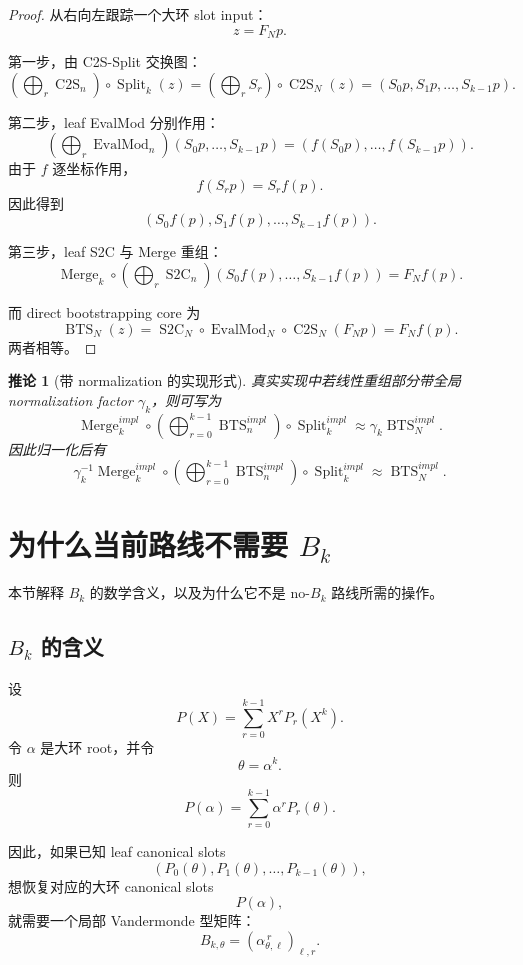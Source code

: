 \documentclass[UTF8,11pt]{ctexart}
\newtheorem{corollary}{推论}
\theoremstyle{definition}
\newcommand{\CtwoS}{\operatorname{C2S}}
\newcommand{\StwoC}{\operatorname{S2C}}
\newcommand{\BTS}{\operatorname{BTS}}
\newcommand{\Split}{\operatorname{Split}}
\newcommand{\Merge}{\operatorname{Merge}}
\newcommand{\EvalMod}{\operatorname{EvalMod}}
\begin{document}
\begin{proof}
从右向左跟踪一个大环 slot input：
\[
z=F_Np.
\]

第一步，由 C2S-Split 交换图：
\[
\left(\bigoplus_r \CtwoS_n\right)\circ\Split_k(z)
=
\left(\bigoplus_r S_r\right)\circ\CtwoS_N(z)
=
(S_0p,S_1p,\ldots,S_{k-1}p).
\]

第二步，leaf EvalMod 分别作用：
\[
\left(\bigoplus_r \EvalMod_n\right)(S_0p,\ldots,S_{k-1}p)
=
(f(S_0p),\ldots,f(S_{k-1}p)).
\]
由于 \(f\) 逐坐标作用，
\[
f(S_rp)=S_rf(p).
\]
因此得到
\[
(S_0f(p),S_1f(p),\ldots,S_{k-1}f(p)).
\]

第三步，leaf S2C 与 Merge 重组：
\[
\Merge_k
\circ
\left(\bigoplus_r\StwoC_n\right)
(S_0f(p),\ldots,S_{k-1}f(p))
=
F_Nf(p).
\]

而 direct bootstrapping core 为
\[
\BTS_N(z)
=
\StwoC_N\circ\EvalMod_N\circ\CtwoS_N(F_Np)
=
F_Nf(p).
\]
两者相等。
\end{proof}

\begin{corollary}[带 normalization 的实现形式]
真实实现中若线性重组部分带全局 normalization factor \(\gamma_k\)，则可写为
\[
\boxed{
\Merge_k^{impl}
\circ
\left(
\bigoplus_{r=0}^{k-1}\BTS_n^{impl}
\right)
\circ
\Split_k^{impl}
\approx
\gamma_k \BTS_N^{impl}.
}
\]
因此归一化后有
\[
\boxed{
\gamma_k^{-1}
\Merge_k^{impl}
\circ
\left(
\bigoplus_{r=0}^{k-1}\BTS_n^{impl}
\right)
\circ
\Split_k^{impl}
\approx
\BTS_N^{impl}.
}
\]
\end{corollary}

\section{为什么当前路线不需要 \(B_k\)}

本节解释 \(B_k\) 的数学含义，以及为什么它不是 no-\(B_k\) 路线所需的操作。

\subsection{\(B_k\) 的含义}

设
\[
P(X)=\sum_{r=0}^{k-1}X^rP_r(X^k).
\]
令 \(\alpha\) 是大环 root，并令
\[
\theta=\alpha^k.
\]
则
\[
P(\alpha)
=
\sum_{r=0}^{k-1}\alpha^rP_r(\theta).
\]

因此，如果已知 leaf canonical slots
\[
(P_0(\theta),P_1(\theta),\ldots,P_{k-1}(\theta)),
\]
想恢复对应的大环 canonical slots
\[
P(\alpha),
\]
就需要一个局部 Vandermonde 型矩阵：
\[
B_{k,\theta}
=
\left(\alpha_{\theta,\ell}^{\,r}\right)_{\ell,r}.
\]
\end{document}
